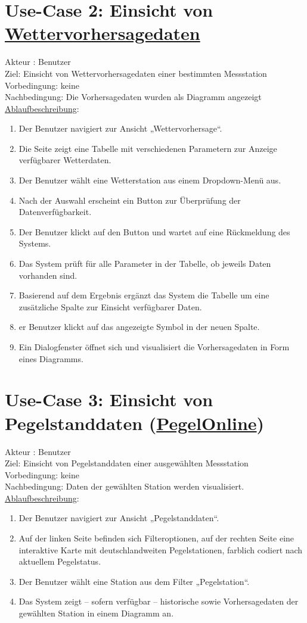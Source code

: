 \documentclass[a4paper,12pt]{scrreprt}
\begin{document}
	\section*{\small \textbf{Use-Case 2: Einsicht von \href{https://wetterdienst.readthedocs.io/en/latest/} {Wettervorhersagedaten}}}
	Akteur : Benutzer\\
	Ziel:  Einsicht von Wettervorhersagedaten einer bestimmten Messstation\\
	Vorbedingung: keine\\
	Nachbedingung: Die Vorhersagedaten wurden als Diagramm angezeigt\\
	\underline{Ablaufbeschreibung}:
	\begin{enumerate}
		\item Der Benutzer navigiert zur Ansicht „Wettervorhersage“.
		\item Die Seite zeigt eine Tabelle mit verschiedenen Parametern zur Anzeige verfügbarer Wetterdaten.
		\item Der Benutzer wählt eine Wetterstation aus einem Dropdown-Menü aus.
		\item Nach der Auswahl erscheint ein Button zur Überprüfung der Datenverfügbarkeit.
		\item Der Benutzer klickt auf den Button und wartet auf eine Rückmeldung des Systems.
		\item Das System prüft für alle Parameter in der Tabelle, ob jeweils Daten vorhanden sind.
		\item Basierend auf dem Ergebnis ergänzt das System die Tabelle um eine zusätzliche Spalte zur Einsicht verfügbarer Daten.
		\item er Benutzer klickt auf das angezeigte Symbol in der neuen Spalte.
		\item Ein Dialogfenster öffnet sich und visualisiert die Vorhersagedaten in Form eines Diagramms. 
	\end{enumerate}
	\section*{\small \textbf{Use-Case 3: Einsicht von Pegelstanddaten  (\href{https://www.pegelonline.wsv.de/gast/start} {PegelOnline})}}
	Akteur : Benutzer\\
	Ziel:  Einsicht von Pegelstanddaten einer ausgewählten Messstation\\
	Vorbedingung: keine\\
	Nachbedingung: Daten der gewählten Station werden visualisiert.\\
	\underline{Ablaufbeschreibung}:
	\begin{enumerate}
		\item Der Benutzer navigiert zur Ansicht „Pegelstanddaten“.
		\item Auf der linken Seite befinden sich Filteroptionen, auf der rechten Seite eine interaktive Karte mit deutschlandweiten Pegelstationen, farblich codiert nach aktuellem Pegelstatus.
		\item Der Benutzer wählt eine Station aus dem Filter „Pegelstation“.
		\item Das System zeigt – sofern verfügbar – historische sowie Vorhersagedaten der gewählten Station in einem Diagramm an.
	\end{enumerate}
\end{document}
